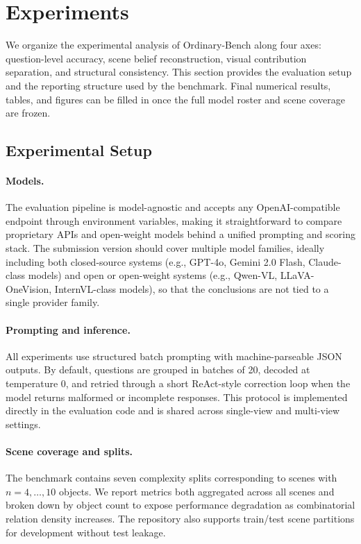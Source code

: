 \section{Experiments}
\label{sec:experiments}

We organize the experimental analysis of Ordinary-Bench along four axes: question-level accuracy, scene belief reconstruction, visual contribution separation, and structural consistency. This section provides the evaluation setup and the reporting structure used by the benchmark. Final numerical results, tables, and figures can be filled in once the full model roster and scene coverage are frozen.

\subsection{Experimental Setup}
\label{sec:exp-setup}

\paragraph{Models.}
The evaluation pipeline is model-agnostic and accepts any OpenAI-compatible endpoint through environment variables, making it straightforward to compare proprietary APIs and open-weight models behind a unified prompting and scoring stack. The submission version should cover multiple model families, ideally including both closed-source systems (e.g., GPT-4o, Gemini 2.0 Flash, Claude-class models) and open or open-weight systems (e.g., Qwen-VL, LLaVA-OneVision, InternVL-class models), so that the conclusions are not tied to a single provider family.

\paragraph{Prompting and inference.}
All experiments use structured batch prompting with machine-parseable JSON outputs. By default, questions are grouped in batches of 20, decoded at temperature 0, and retried through a short ReAct-style correction loop when the model returns malformed or incomplete responses. This protocol is implemented directly in the evaluation code and is shared across single-view and multi-view settings.

\paragraph{Scene coverage and splits.}
The benchmark contains seven complexity splits corresponding to scenes with $n=4,\ldots,10$ objects. We report metrics both aggregated across all scenes and broken down by object count to expose performance degradation as combinatorial relation density increases. The repository also supports train/test scene partitions for development without test leakage.

